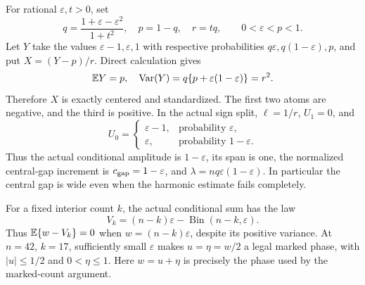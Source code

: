 For rational $\varepsilon,t>0$, set
\begin{equation}\label{v9:harmonic:family}
 q=\frac{1+\varepsilon-\varepsilon^2}{1+t^2},\quad
 p=1-q,\quad r=tq,
 \qquad 0<\varepsilon<p<1.
\end{equation}
Let $Y$ take the values $\varepsilon-1,\varepsilon,1$ with respective
probabilities $q\varepsilon,q(1-\varepsilon),p$, and put $X=(Y-p)/r$.
Direct calculation gives
\[
 \mathbb E Y=p,\quad
 \operatorname{Var}(Y)=q\{p+\varepsilon(1-\varepsilon)\}=r^2.
\]
Therefore $X$ is exactly centered and standardized. The first two atoms
are negative, and the third is positive. In the actual sign split,
$\ell=1/r$, $U_1=0$, and
\[
 U_0=\begin{cases}\varepsilon-1,&\text{probability }\varepsilon,\\
                  \varepsilon,&\text{probability }1-\varepsilon.
       \end{cases}
\]
Thus the actual conditional amplitude is $1-\varepsilon$, its span is
one, the normalized central-gap increment is $c_{\rm gap}=1-\varepsilon$,
and $\lambda=nq\varepsilon(1-\varepsilon)$.
In particular the central gap is wide even when the harmonic estimate
fails completely.

For a fixed interior count $k$, the actual conditional sum has the law
\[
 V_k=(n-k)\varepsilon-\operatorname{Bin}(n-k,\varepsilon).
\]
Thus $\mathbb E\{w-V_k\}=0$ when $w=(n-k)\varepsilon$, despite its positive
variance. At $n=42$, $k=17$, sufficiently small $\varepsilon$ makes
$u=\eta=w/2$ a legal marked phase, with $|u|\le1/2$ and $0<\eta\le1$.
Here $w=u+\eta$ is precisely the phase used by the marked-count argument.

